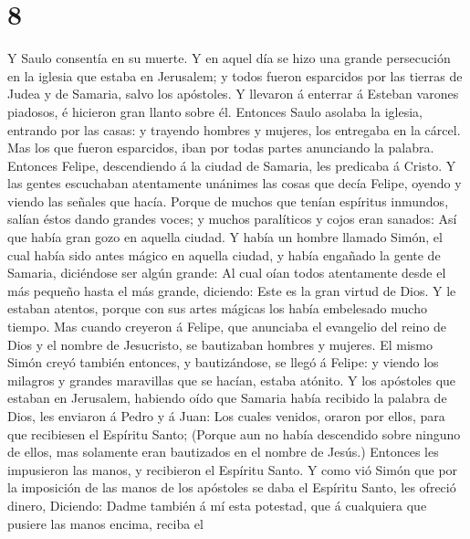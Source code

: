\hypertarget{section-7}{%
\section{8}\label{section-7}}

 Y Saulo consentía en su muerte. Y en aquel día se hizo
una grande persecución en la iglesia que estaba en Jerusalem; y todos
fueron esparcidos por las tierras de Judea y de Samaria, salvo los
apóstoles.  Y llevaron á enterrar á Esteban varones
piadosos, é hicieron gran llanto sobre él.  Entonces Saulo
asolaba la iglesia, entrando por las casas: y trayendo hombres y
mujeres, los entregaba en la cárcel.  Mas los que fueron
esparcidos, iban por todas partes anunciando la palabra. 
Entonces Felipe, descendiendo á la ciudad de Samaria, les predicaba á
Cristo.  Y las gentes escuchaban atentamente unánimes las
cosas que decía Felipe, oyendo y viendo las señales que hacía.
 Porque de muchos que tenían espíritus inmundos, salían
éstos dando grandes voces; y muchos paralíticos y cojos eran sanados:
 Así que había gran gozo en aquella ciudad. 
Y había un hombre llamado Simón, el cual había sido antes mágico en
aquella ciudad, y había engañado la gente de Samaria, diciéndose ser
algún grande:  Al cual oían todos atentamente desde el
más pequeño hasta el más grande, diciendo: Este es la gran virtud de
Dios.  Y le estaban atentos, porque con sus artes mágicas
los había embelesado mucho tiempo.  Mas cuando creyeron á
Felipe, que anunciaba el evangelio del reino de Dios y el nombre de
Jesucristo, se bautizaban hombres y mujeres.  El mismo
Simón creyó también entonces, y bautizándose, se llegó á Felipe: y
viendo los milagros y grandes maravillas que se hacían, estaba atónito.
 Y los apóstoles que estaban en Jerusalem, habiendo oído
que Samaria había recibido la palabra de Dios, les enviaron á Pedro y á
Juan:  Los cuales venidos, oraron por ellos, para que
recibiesen el Espíritu Santo;  (Porque aun no había
descendido sobre ninguno de ellos, mas solamente eran bautizados en el
nombre de Jesús.)  Entonces les impusieron las manos, y
recibieron el Espíritu Santo.  Y como vió Simón que por
la imposición de las manos de los apóstoles se daba el Espíritu Santo,
les ofreció dinero,  Diciendo: Dadme también á mí esta
potestad, que á cualquiera que pusiere las manos encima, reciba el
